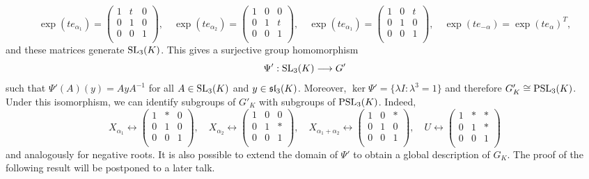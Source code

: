 \begin{equation}\label{eq:exp}
\exp(te_{\alpha_1})=\begin{pmatrix}
    1 & t & 0\\
    0 & 1 & 0\\
    0 & 0 & 1\\
\end{pmatrix},\quad\exp(te_{\alpha_2})=\begin{pmatrix}
    1 & 0 & 0\\
    0 & 1 & t\\
    0 & 0 & 1\\
\end{pmatrix},\quad\exp(te_{\alpha_1})=\begin{pmatrix}
    1 & 0 & t\\
    0 & 1 & 0\\
    0 & 0 & 1\\
\end{pmatrix},\quad\exp(te_{-\alpha})=\exp(te_\alpha)^T,
\end{equation}
and these matrices generate $\mathrm{SL}_3(K)$. This gives a surjective group homomorphism 
$$\Psi':\mathrm{SL}_3(K)\longrightarrow G'$$
such that $\Psi'(A)(y)=AyA^{-1}$ for all $A\in\mathrm{SL}_3(K)$ and $y\in\mathfrak{sl}_3(K)$. Moreover, $\ker\Psi'=\{\lambda I:\lambda^3=1\}$ and therefore $G'_K\cong\mathrm{PSL}_3(K)$. Under this isomorphism, we can identify subgroups of $G'_K$ with subgroups of $\mathrm{PSL}_3(K)$. Indeed,
\begin{equation*}
    X_{\alpha_1}\longleftrightarrow\begin{pmatrix}
        1 & * & 0\\
        0 & 1 & 0\\
        0 & 0 & 1\\
    \end{pmatrix},\quad X_{\alpha_2}\longleftrightarrow\begin{pmatrix}
        1 & 0 & 0\\
        0 & 1 & *\\
        0 & 0 & 1\\
    \end{pmatrix},\quad X_{\alpha_1+\alpha_2}\longleftrightarrow\begin{pmatrix}
        1 & 0 & *\\
        0 & 1 & 0\\
        0 & 0 & 1\\
    \end{pmatrix},\quad U\longleftrightarrow\begin{pmatrix}
        1 & * & *\\
        0 & 1 & *\\
        0 & 0 & 1\\
    \end{pmatrix}
\end{equation*}
and analogously for negative roots. It is also possible to extend the domain of $\Psi'$ to obtain a global description of $G_K$. The proof of the following result will be postponed to a later talk.

